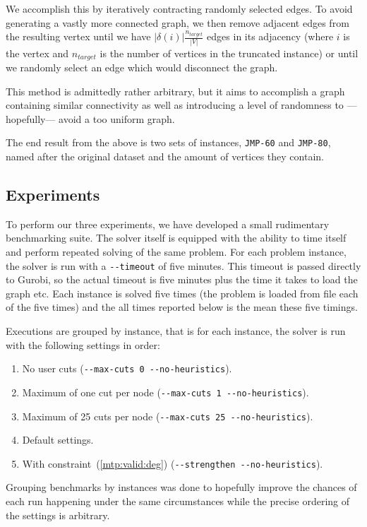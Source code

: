  We accomplish this by iteratively contracting randomly selected edges. To avoid generating a
 vastly more connected graph, we then remove adjacent edges from the resulting vertex until
 we have $|\delta(i)| \frac{n_{target}}{|V|}$ edges in its adjacency (where $i$ is the vertex
 and $n_{target}$ is the number of vertices in the truncated instance) or until we randomly select
 an edge which would disconnect the graph.

 This method is admittedly rather arbitrary, but it aims to accomplish a graph containing similar
 connectivity as well as introducing a level of randomness to ---hopefully--- avoid a too uniform graph.

 The end result from the above is two sets of instances, \texttt{JMP-60} and \texttt{JMP-80}, named
 after the original dataset and the amount of vertices they contain.
 
 \subsection{Experiments}

 To perform our three experiments, we have developed a small rudimentary benchmarking suite. The solver
 itself is equipped with the ability to time itself and perform repeated solving of the same problem.
 For each problem instance, the solver is run with a \texttt{-{}-timeout} of five minutes. This timeout
 is passed directly to Gurobi, so the actual timeout is five minutes plus the time it takes to load the
 graph etc. Each instance is solved five times (the problem is loaded from file each of the five times)
 and the all times reported below is the mean these five timings.

 Executions are grouped by instance, that is for each instance, the solver is run with the following
 settings in order:
 \begin{enumerate}
 \item No user cuts (\texttt{-{}-max-cuts 0 -{}-no-heuristics}).
 \item Maximum of one cut per node (\texttt{-{}-max-cuts 1 -{}-no-heuristics}).
 \item Maximum of 25 cuts per node (\texttt{-{}-max-cuts 25 -{}-no-heuristics}).
 \item Default settings.
 \item With constraint~(\ref{mtp:valid:deg}) (\texttt{-{}-strengthen -{}-no-heuristics}).
 \end{enumerate}
 Grouping benchmarks by instances was done to hopefully improve the chances of each run happening
 under the same circumstances while the precise ordering of the settings is arbitrary.
 
